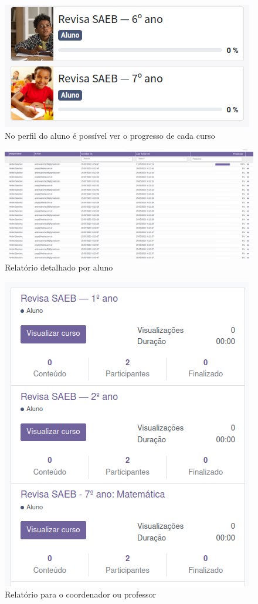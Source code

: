 \begin{figure}[H]
\includegraphics[width=\textwidth]{imgs/progresso}
\caption{No perfil do aluno é possível ver o progresso de cada curso}
\end{figure}

\begin{figure}[H]
\includegraphics[width=\textwidth]{imgs/relatorio}
\caption{Relatório detalhado por aluno}
\end{figure}


\begin{figure}[H]
\includegraphics[width=.7\textwidth]{imgs/relatorio1}
\caption{Relatório para o coordenador ou professor}
\end{figure}



